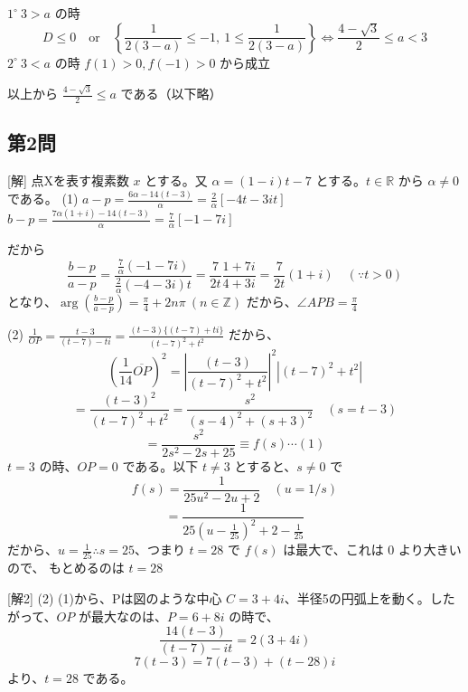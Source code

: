 \documentclass[../main.tex]{subfiles}
\begin{document}
$1^\circ \ 3 > a$ の時
$$D \le 0 \quad \text{or} \quad \left\{ \frac{1}{2(3-a)} \le -1, \ 1 \le \frac{1}{2(3-a)} \right\} \iff \frac{4-\sqrt{3}}{2} \le a < 3$$
$2^\circ \ 3 < a$ の時
$f(1) > 0, f(-1) > 0$ から成立

以上から $\frac{4-\sqrt{3}}{2} \le a$ である（以下略）

\subsection*{第2問}
[解] 点Xを表す複素数 $x$ とする。又 $\alpha = (1-i)t - 7$ とする。$t \in \mathbb{R}$ から $\alpha \neq 0$ である。
(1) $a-p = \frac{6\alpha - 14(t-3)}{\alpha} = \frac{2}{\alpha}[-4t-3it]$
$b-p = \frac{7\alpha(1+i) - 14(t-3)}{\alpha} = \frac{7}{\alpha}[-1-7i]$

だから
$$\frac{b-p}{a-p} = \frac{\frac{7}{\alpha}(-1-7i)}{\frac{2}{\alpha}(-4-3i)t} = \frac{7}{2t} \frac{1+7i}{4+3i} = \frac{7}{2t} (1+i) \quad (\because t > 0)$$
となり、$\arg\left(\frac{b-p}{a-p}\right) = \frac{\pi}{4} + 2n\pi \ (n \in \mathbb{Z})$ だから、$\angle APB = \frac{\pi}{4}$

(2) $\frac{1}{OP} = \frac{t-3}{(t-7)-ti} = \frac{(t-3)\{(t-7)+ti\}}{(t-7)^2+t^2}$ だから、
$$(\frac{1}{14} \overline{OP})^2 = \left| \frac{(t-3)}{(t-7)^2+t^2} \right|^2 \left| (t-7)^2 + t^2 \right|$$
$$= \frac{(t-3)^2}{(t-7)^2+t^2} = \frac{s^2}{(s-4)^2+(s+3)^2} \quad (s = t-3)$$
$$= \frac{s^2}{2s^2-2s+25} \equiv f(s) \cdots (1)$$
$t=3$ の時、$OP=0$ である。以下 $t \neq 3$ とすると、$s \neq 0$ で
$$f(s) = \frac{1}{25u^2-2u+2} \quad (u = 1/s)$$
$$= \frac{1}{25(u-\frac{1}{25})^2 + 2 - \frac{1}{25}}$$
だから、$u = \frac{1}{25} \therefore s=25$、つまり $t=28$ で $f(s)$ は最大で、これは $0$ より大きいので、
もとめるのは $t=28$

[解2]
(2) (1)から、Pは図のような中心 $C=3+4i$、半径5の円弧上を動く。したがって、$OP$ が最大なのは、$P=6+8i$ の時で、
$$\frac{14(t-3)}{(t-7)-it} = 2(3+4i)$$
$$7(t-3) = 7(t-3) + (t-28)i$$
より、$t=28$ である。
\begin{center}
\end{center}
\end{document}
